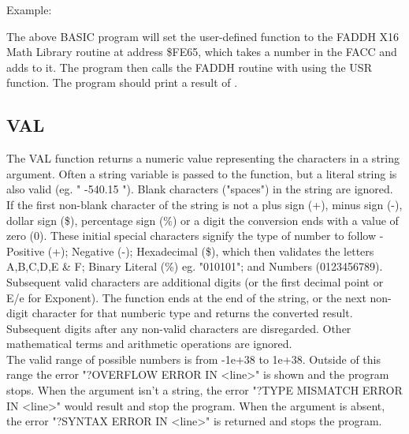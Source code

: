 Example:\\


The above BASIC program will set the user-defined function to the {\ttfamily
FADDH} X16 Math Library routine at address {\ttfamily \$FE65}, which takes a
number in the FACC and adds {} to it.  The program then calls the
{\ttfamily FADDH} routine with {} using the {\ttfamily USR}
function.  The program should print a result of {}.

\subsection{VAL}

The {\ttfamily VAL} function returns a numeric value representing the
characters in a string argument.  Often a string variable is passed to the
function, but a literal string is also valid (eg. "  -540.15 "). Blank
characters ("spaces") in the string are ignored.  If the first non-blank
character of the string is not a plus sign (+), minus sign (-), dollar sign
(\$), percentage sign (\%) or a digit the conversion ends with a value of zero
(0).  These initial special characters signify the type of number to follow -
Positive (+); Negative (-); Hexadecimal (\$), which then validates the letters
A,B,C,D,E \& F; Binary Literal (\%) eg. "010101"; and Numbers (0123456789).
Subsequent valid characters are additional digits (or the first decimal point
or E/e for Exponent).  The function ends at the end of the string, or the next
non-digit character for that numberic type and returns the converted result.
Subsequent digits after any non-valid characters are disregarded.  Other
mathematical terms and arithmetic operations are ignored.\\

The valid range of possible numbers is from -1e+38 to 1e+38. Outside of this
range the error "?OVERFLOW ERROR IN <line>" is shown and the program stops.
When the argument isn't a string, the error "?TYPE MISMATCH ERROR IN <line>"
would result and stop the program.  When the argument is absent, the error
"?SYNTAX ERROR IN <line>" is returned and stops the program.\\


